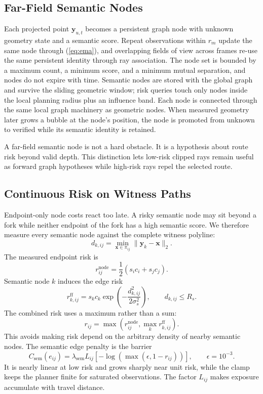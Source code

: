 \documentclass[letterpaper,10pt,conference]{ieeeconf}
\newcommand{\vect}[1]{\boldsymbol{#1}}
\begin{document}
\subsection{Far-Field Semantic Nodes}
Each projected point $\vect{y}_{u,t}$ becomes a persistent graph node with
unknown geometry state and a semantic score.
Repeat observations within $r_m$ update the same node through
(\ref{eq:ema}), and overlapping fields of view across frames re-use the same
persistent identity through ray association.
The node set is bounded by a maximum count, a minimum score, and a minimum
mutual separation, and nodes do not expire with time.
Semantic nodes are stored with the global graph and survive the sliding
geometric window; risk queries touch only nodes inside the local planning
radius plus an influence band.
Each node is connected through the same local graph machinery as geometric
nodes.
When measured geometry later grows a bubble at the node's position, the node
is promoted from unknown to verified while its semantic identity is
retained.

A far-field semantic node is not a hard obstacle.
It is a hypothesis about route risk beyond valid depth.
This distinction lets low-risk clipped rays remain useful as forward graph
hypotheses while high-risk rays repel the selected route.

\subsection{Continuous Risk on Witness Paths}
Endpoint-only node costs react too late.
A risky semantic node may sit beyond a fork while neither endpoint of the
fork has a high semantic score.
We therefore measure every semantic node against the complete witness
polyline:
\begin{equation}
 d_{k,ij}=\min_{\vect{x}\in\pi_{ij}}
             \|\vect{y}_k-\vect{x}\|_2.
\label{eq:anchor_distance}
\end{equation}
The measured endpoint risk is
\begin{equation}
 r^{\mathrm{node}}_{ij}=\frac{1}{2}(s_i c_i+s_j c_j).
\end{equation}
Semantic node $k$ induces the edge risk
\begin{equation}
 r^{\mathrm{ff}}_{k,ij}=s_kc_k
 \exp\left(-\frac{d_{k,ij}^2}{2\sigma_s^2}\right),
 \qquad d_{k,ij}\le R_s.
\label{eq:field}
\end{equation}
The combined risk uses a maximum rather than a sum:
\begin{equation}
 r_{ij}=\max\left(r^{\mathrm{node}}_{ij},
                  \max_k r^{\mathrm{ff}}_{k,ij}\right).
\label{eq:risk}
\end{equation}
This avoids making risk depend on the arbitrary density of nearby semantic
nodes.
The semantic edge penalty is the barrier
\begin{equation}
 C_{\mathrm{sem}}(e_{ij})=
 \lambda_{\mathrm{sem}}L_{ij}[-\log(\max(\epsilon,1-r_{ij}))],
 \qquad \epsilon=10^{-3}.
\label{eq:semantic_cost}
\end{equation}
It is nearly linear at low risk and grows sharply near unit risk, while the
clamp keeps the planner finite for saturated observations.
The factor $L_{ij}$ makes exposure accumulate with travel distance.
\end{document}

